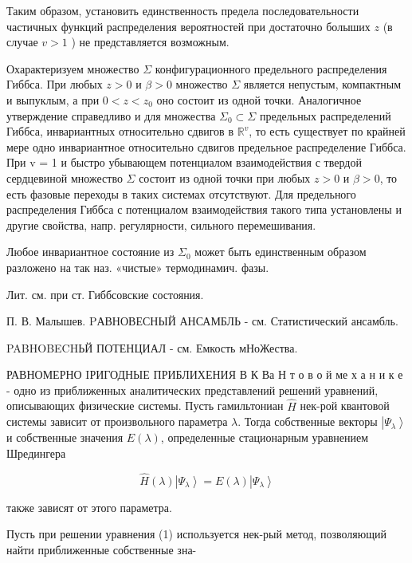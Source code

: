 \documentclass[10pt]{article}
\begin{document}
Таким образом, установить единственность предела последовательности частичных функций распределения вероятностей при достаточно болыших $z$ (в случае $v>1$ ) не представляется возможным.



Охарактеризуем множество $\Sigma$ конфигурационного предельного распределения Гиббса. При любых $z>0$ и $\beta>0$ множество $\Sigma$ является непустым, компактным и выпуклым, а при $0<z<z_{0}$ оно состоит из одной точки. Аналогичное утверждение справедливо и для множества $\Sigma_{0} \subset \Sigma$ предельных распределений Гиббса, инвариантных относительно сдвигов в $\mathbb{R}^{v}$, то есть существует по крайней мере одно инвариантное относительно сдвигов предельное распределение Гиббса. При v = 1 и быстро убывающем потенциалом взаимодействия с твердой сердцевиной множество $\Sigma$ состоит из одной точки при любых $z>0$ и $\beta>0$, то есть фазовые переходы в таких системах отсутствуют. Для предельного распределения Гиббса с потенциалом взаимодействия такого типа установлены и другие свойства, напр. регулярности, сильного перемешивания.



Любое инвариантное состояние из $\Sigma_{0}$ может быть единственным образом разложено на так наз. «чистые» термодинамич. фазы.



Лит. см. при ст. Гиббсовские состояния.



П. В. Малышев. PАВНОВЕСНЫЙ АНСАМБЛЬ - см. Статистический ансамбль.



PABHOBECHЬЙ ПОТЕНЦИАЛ - см. Емкость мНоЖества.



РАВНОМЕРНО IРИГОДНЫЕ ПРИБЛИХЕНИЯ В К Ва Н т о в о й ме х а н и к е - одно из приближенных аналитических представлений решений уравнений, описывающих физические системы. Пусть гамильтониан $\hat{H}$ нек-рой квантовой системы зависит от произвольного параметра $\lambda$. Тогда собственные векторы $\left|\Psi_{\lambda}\right\rangle$ и собственные значения $E(\lambda)$, определенные стационарным уравнением Шредингера



\[

\hat{H}(\lambda)\left|\Psi_{\lambda}\right\rangle=E(\lambda)\left|\Psi_{\lambda}\right\rangle

\]



также зависят от этого параметра.



Пусть при решении уравнения (1) используется нек-рый метод, позволяющий найти приближенные собственные зна-
\end{document}
